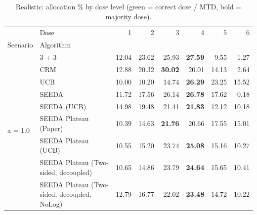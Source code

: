\begin{table}[H]
\centering
\caption{Realistic: allocation \% by dose level (green = correct dose / MTD, bold = majority dose).}
\label{tab:real_alloc_by_dose}
\begin{tabular}{llrrrrrr}
\toprule
 & Dose & 1 & 2 & 3 & 4 & 5 & 6 \\
Scenario & Algorithm &  &  &  &  &  &  \\
\midrule
\multirow[c]{9}{*}{a = 1.0} & 3 + 3 & 12.04 & 23.62 & {\cellcolor[HTML]{C8E6C9}} 25.93 & \bfseries 27.59 & 9.55 & 1.27 \\
 & CRM & 12.88 & 20.32 & {\cellcolor[HTML]{C8E6C9}} \bfseries 30.02 & 20.01 & 14.13 & 2.64 \\
 & UCB & 10.00 & 10.20 & {\cellcolor[HTML]{C8E6C9}} 14.74 & \bfseries 26.29 & 23.25 & 15.52 \\
 & SEEDA & 11.72 & 17.56 & {\cellcolor[HTML]{C8E6C9}} 26.14 & \bfseries 26.78 & 17.62 & 0.18 \\
 & SEEDA (UCB) & 14.98 & 19.48 & {\cellcolor[HTML]{C8E6C9}} 21.41 & \bfseries 21.83 & 12.12 & 10.18 \\
 & SEEDA Plateau (Paper) & 10.39 & 14.63 & {\cellcolor[HTML]{C8E6C9}} \bfseries 21.76 & 20.66 & 17.55 & 15.01 \\
 & SEEDA Plateau (UCB) & 10.55 & 15.20 & {\cellcolor[HTML]{C8E6C9}} 23.74 & \bfseries 25.08 & 15.16 & 10.27 \\
 & SEEDA Plateau (Two-sided, decoupled) & 10.65 & 14.86 & {\cellcolor[HTML]{C8E6C9}} 23.79 & \bfseries 24.64 & 15.65 & 10.41 \\
 & SEEDA Plateau (Two-sided, decoupled, NoLog) & 12.79 & 16.77 & {\cellcolor[HTML]{C8E6C9}} 22.02 & \bfseries 23.48 & 14.72 & 10.22 \\
\bottomrule
\end{tabular}
\end{table}
